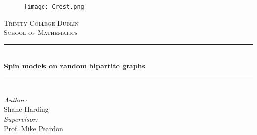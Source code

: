 \documentclass[pdftex,12pt,a4paper]{article}
\newcommand{\HRule}{\rule{\linewidth}{0.5mm}}
\begin{document}
\begin{titlepage}
\begin{center}

\begin{figure}

\centering
\texttt{[image: Crest.png]}

\end{figure}


\textsc{\LARGE Trinity College Dublin}\\
\textsc{\Large School of Mathematics}

\HRule \\[0.4cm]
{\huge \bfseries Spin models on random bipartite graphs \\[0.4cm] }

\HRule \\[1.5cm]

\Large \emph{Author:} \\ Shane Harding \\[0.8cm]

\large \emph{Supervisor:} \\ Prof. Mike Peardon

\end{center}


\end{titlepage}
\end{document}
